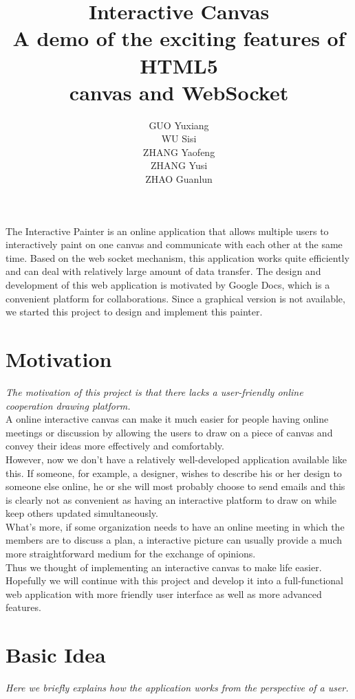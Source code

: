 \documentclass[a4paper,11pt,3p]{article}
\title{
  \textbf{Interactive Canvas}\\
  A demo of the exciting features of HTML5\\
  canvas and WebSocket
}
\author{
  GUO Yuxiang\\
  WU Sisi\\
  ZHANG Yaofeng\\
  ZHANG Yusi\\
  ZHAO Guanlun
}
\date{}
\begin{document}
\maketitle

\abstract{}
The Interactive Painter is an online application that allows multiple users to
interactively paint on one canvas and communicate with each other at the same
time. Based on the web socket mechanism, this application works quite
efficiently and can deal with relatively large amount of data transfer. The
design and development of this web application is motivated by Google Docs,
which is a convenient platform for collaborations. Since a graphical version
is not available, we started this project to design and implement this
painter.

\section{Motivation}
\emph{The motivation of this project is that there lacks a user-friendly
online cooperation drawing platform.}\\

A online interactive canvas can make it much easier for people having online 
meetings or discussion by allowing the users to draw on a piece of canvas and 
convey their ideas more effectively and comfortably.\\

However, now we don't have a relatively well-developed application available like 
this. If someone, for example, a designer, wishes to describe his or her design to 
someone else online, he or she will most probably choose to send emails and this is 
clearly not as convenient as having an interactive platform to draw on while keep 
others updated simultaneously.\\

What's more, if some organization needs to have an online meeting in which the members 
are to discuss a plan, a interactive picture can usually provide a much more straightforward
medium for the exchange of opinions.\\

Thus we thought of implementing an interactive canvas to make life easier. Hopefully 
we will continue with this project and develop it into a full-functional web application 
with more friendly user interface as well as more advanced features.\\

\section{Basic Idea}
\emph{Here we briefly explains how the application works from the perspective of a
user.}\\
\end{document}
